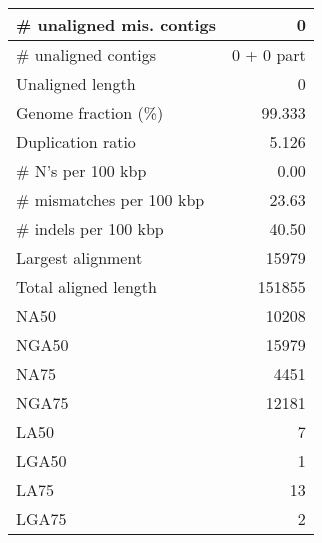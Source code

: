 \documentclass[12pt,a4paper]{article}
\begin{document}
\begin{table}[ht]
\begin{center}
\begin{tabular}{|l*{1}{|r}|}
\# unaligned mis. contigs & 0 \\ \hline
\# unaligned contigs & 0 + 0 part \\ \hline
Unaligned length & 0 \\ \hline
Genome fraction (\%) & 99.333 \\ \hline
Duplication ratio & 5.126 \\ \hline
\# N's per 100 kbp & 0.00 \\ \hline
\# mismatches per 100 kbp & 23.63 \\ \hline
\# indels per 100 kbp & 40.50 \\ \hline
Largest alignment & 15979 \\ \hline
Total aligned length & 151855 \\ \hline
NA50 & 10208 \\ \hline
NGA50 & 15979 \\ \hline
NA75 & 4451 \\ \hline
NGA75 & 12181 \\ \hline
LA50 & 7 \\ \hline
LGA50 & 1 \\ \hline
LA75 & 13 \\ \hline
LGA75 & 2 \\ \hline
\end{tabular}
\end{center}
\end{table}
\end{document}
